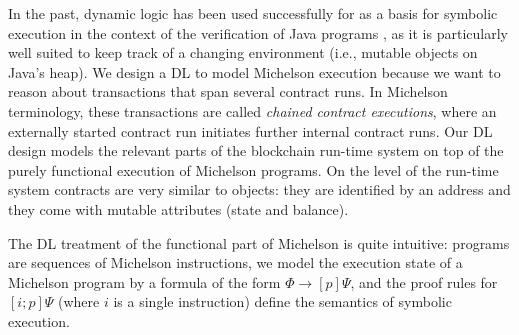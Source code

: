 \begin{comment}
  Such formulas are verified by successively reducing the program it
  contains until one is left with a purely first order formula that
  does not contain programs anymore, which can then be verified using
  the calculus of the first order logic that the DL is based on:
  \begin{align*}
    \langle i ; i' ; &\cdots ; i^n \rangle \phi
    \\ \leftrightarrow	\qquad		\langle     i' ; &\cdots ; i^n \rangle \phi'
    \\							 &\quad\vdots
    \\ \leftrightarrow	\qquad	\langle \rangle \phi^n	 &\leftrightarrow \phi^n
    \\							 &\quad\vdots
  \end{align*}

  This thesis focuses on these symbolic execution rules of the
  calculus and their soundness proof.  Firstly, we choose a
  representative subset of Michelson and give a reference
  implementation of it.  Then we define the symbolic execution rules
  for that subset and prove their soundness with respect to the
  reference implementation.
\end{comment}



In the past, dynamic
logic has been used successfully for as a basis for symbolic execution
in the context of the verification of Java programs \cite{KeY3}, as it
is particularly well suited to keep track of a changing environment (i.e., mutable
objects on Java's heap). 
We design a DL to model Michelson execution because we want to reason about
transactions that span several contract runs. In Michelson
terminology, these transactions are called \emph{chained contract
  executions}, where an externally started contract run
initiates further internal contract runs.
Our DL design models the relevant parts of the
blockchain run-time system on top of the purely functional execution of
Michelson programs. On the level of the run-time system contracts are
very similar to objects: they are identified by an address and they
come with mutable attributes (state and balance). 


The DL treatment of the functional part of Michelson is quite
intuitive: programs are sequences of Michelson instructions, we model
the execution state of a Michelson program by a formula of the form $\Phi \to [p]\Psi$, and the proof
rules for $[i;p]\Psi$ (where $i$ is a single instruction) define the
semantics of symbolic execution.


